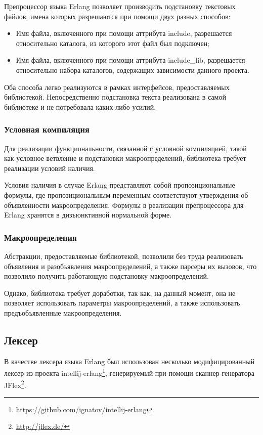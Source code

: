 Препроцессор языка Erlang позволяет производить подстановку текстовых файлов, имена которых разрешаются при помощи двух разных способов:

\begin{itemize}
\item Имя файла, включенного при помощи аттрибута include, разрешается относительно каталога, из которого этот файл был подключен;
\item Имя файла, включенного при помощи аттрибута include\_lib, разрешается относительно набора каталогов, содержащих зависимости данного проекта.
\end{itemize}

Оба способа легко реализуются в рамках интерфейсов, предоставляемых библиотекой. Непосредственно подстановка текста реализована в самой библиотеке и не потребовала каких-либо усилий.

\subsubsection{Условная компиляция}

Для реализации функциональности, связанной с условной компиляцией, такой как условное ветвление и подстановки макроопределений, библиотека требует реализации условий наличия.

Условия наличия в случае Erlang представляют собой пропозициональные формулы, где пропозициональным переменным соответствуют утверждения об объявленности макроопределения. Формулы в реализации препроцессора для Erlang хранятся в дизъюнктивной нормальной форме.

\subsubsection{Макроопределения}

Абстракции, предоставляемые библиотекой, позволили без труда реализовать объявления и разобъявления макроопределений, а также парсеры их вызовов, что позволило получить работающую подстановку макроопределений.

Однако, библиотека требует доработки, так как, на данный момент, она не позволяет использовать параметры макроопределений, а также использовать предъобъявленные макроопределения.

\subsection{Лексер}

В качестве лексера языка Erlang был использован несколько модифицированный лексер из проекта intellij-erlang\footnote{\url{https://github.com/ignatov/intellij-erlang}}, генерируемый при помощи сканнер-генератора JFlex\footnote{\url{http://jflex.de/}}.

